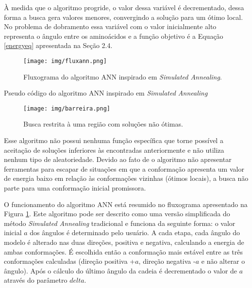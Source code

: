 \documentclass[dm,ppgcomp]{texfurg}
\begin{document}
À medida que o algoritmo progride, o valor dessa variável é decrementado, dessa forma a busca gera valores menores, convergindo a solução para um ótimo local. No problema de dobramento essa variável com o valor inicialmente alto representa o ângulo entre os aminoácidos e a função objetivo é a Equação \ref{energyeq} apresentada na Seção 2.4.

\begin{figure}[htbp]
  \centering \texttt{[image: img/fluxann.png]}
\caption{Fluxograma do algoritmo ANN inspirado em {\it Simulated Annealing}.} 
\label{fluxann}
\end{figure}

\begin{algorithm}
  \caption{Pseudo código do algoritmo ANN inspirado em {\it Simulated Annealing}}\label{annalg}
  \begin{algorithmic}
 
     \ENDIF
     \ENDIF
    \ENDFOR
  \ENDWHILE
  
  \end{algorithmic}
\end{algorithm}

\begin{figure}[htbp]
  \centering \texttt{[image: img/barreira.png]}
\caption{Busca restrita à uma região com soluções não ótimas.} 
\label{barreira}
\end{figure}

Esse algoritmo não possui nenhuma função específica que torne possível a aceitação de soluções inferiores às encontradas anteriormente e não utiliza nenhum tipo de aleatoriedade. Devido ao fato de o algoritmo não apresentar ferramentas para escapar de situações em que a conformação apresenta um valor de energia baixo em relação às conformações vizinhas (ótimos locais), a busca não parte para uma conformação inicial promissora. 

O funcionamento do algoritmo ANN está resumido no fluxograma apresentado na Figura \ref{fluxann}. Este algoritmo pode ser descrito como uma versão simplificada do método {\it Simulated Annealing} tradicional e funciona da seguinte forma: o valor inicial $a$ dos ângulos é determinado pelo usuário. A cada etapa, cada ângulo do modelo é alterado nas duas direções, positiva e negativa, calculando a energia de ambas conformações. É escolhida então a conformação mais estável entre as três conformações calculadas (direção positiva +$a$, direção negativa -$a$ e não alterar o ângulo). Após o cálculo do último ângulo da cadeia é decrementado o valor de $a$ através do parâmetro $delta$. 
\end{document}
